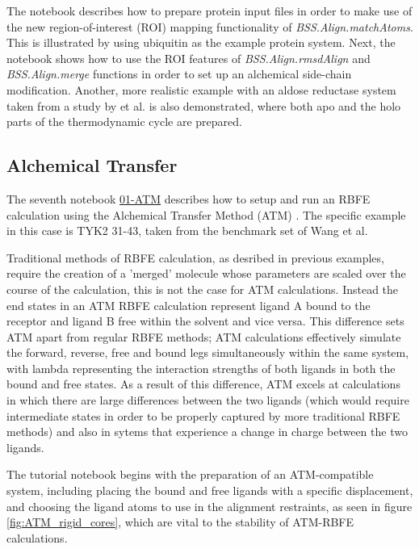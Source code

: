 The notebook describes how to prepare protein input files in order to make use of the new region-of-interest (ROI) mapping functionality of \textit{BSS.Align.matchAtoms}. This is illustrated by using ubiquitin as the example protein system. Next, the notebook shows how to use the ROI features of \textit{BSS.Align.rmsdAlign} and \textit{BSS.Align.merge} functions in order to set up an alchemical side-chain modification. Another, more realistic example with an aldose reductase system taken from a study by \citeauthor{doi:10.1021/acscentsci.8b00717} et al. is also demonstrated, where both apo and the holo parts of the thermodynamic cycle are prepared.

\subsection{Alchemical Transfer}

The seventh notebook \href{https://github.com/OpenBioSim/biosimspace_tutorials/blob/main/04_fep/05_ATM/01-ATM.ipynb}{01-ATM} describes how to setup and run an RBFE calculation using the Alchemical Transfer Method (ATM) \cite{WU2021}. The specific example in this case is TYK2 31-43, taken from the benchmark set of Wang et al. \cite{Wang2015} 

Traditional methods of RBFE calculation, as desribed in previous examples, require the creation of a 'merged' molecule whose parameters are scaled over the course of the calculation, this is not the case for ATM calculations. Instead the end states in an ATM RBFE calculation represent ligand A bound to the receptor and ligand B free within the solvent and vice versa. This difference sets ATM apart from regular RBFE methods; ATM calculations effectively simulate the forward, reverse, free and bound legs simultaneously within the same system, with lambda representing the interaction strengths of both ligands in both the bound and free states. As a result of this difference, ATM excels at calculations in which there are large differences between the two ligands (which would require intermediate states in order to be properly captured by more traditional RBFE methods) and also in sytems that experience a change in charge between the two ligands.

The tutorial notebook begins with the preparation of an ATM-compatible system, including placing the bound and free ligands with a specific displacement, and choosing the ligand atoms to use in the alignment restraints, as seen in figure \ref{fig:ATM_rigid_cores}, which are vital to the stability of ATM-RBFE calculations.

